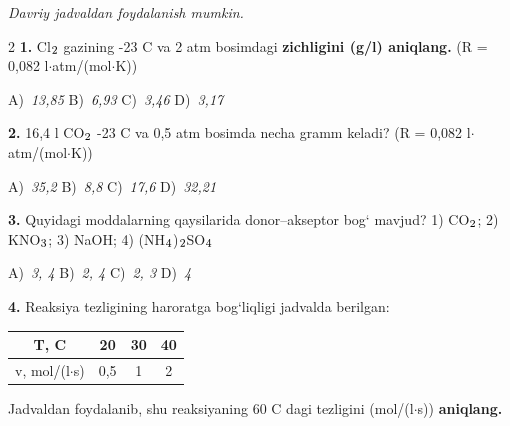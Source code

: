 \documentclass[11pt,a4paper]{article}
\renewcommand{\normalsize}{\fontsize{10.9}{13.4}\selectfont}
\renewcommand{\textsubscript}[1]{\ensuremath{_{\text{\fontsize{8}{8}\selectfont #1}}}}
\begin{document}
\normalsize
\thispagestyle{first}
\noindent{}
\par\medskip
\noindent\textit{Davriy jadvaldan foydalanish mumkin.}
\par\medskip
\begin{multicols}{2}
\noindent\textbf{1.} Cl\textsubscript{2} gazining -23 \textdegree{}C va 2 atm bosimdagi \textbf{zichligini (g/l) aniqlang.} (R = 0,082 l$\cdot$atm/(mol$\cdot$K))

\noindent A)~\textsl{13,85} \hfill B)~\textsl{6,93} \hfill C)~\textsl{3,46} \hfill D)~\textsl{3,17}\par
\vspace{4pt}
\noindent\textbf{2.} 16,4 l CO\textsubscript{2} -23 \textdegree{}C va 0,5 atm bosimda necha gramm keladi? (R = 0,082 l$\cdot$atm/(mol$\cdot$K))

\noindent A)~\textsl{35,2} \hfill B)~\textsl{8,8} \hfill C)~\textsl{17,6} \hfill D)~\textsl{32,21}\par
\vspace{4pt}
\noindent\textbf{3.} Quyidagi moddalarning qaysilarida donor--akseptor bog` mavjud? 1) CO\textsubscript{2}; 2) KNO\textsubscript{3}; 3) NaOH; 4) (NH\textsubscript{4})\textsubscript{2}SO\textsubscript{4}

\noindent A)~\textsl{3, 4} \hfill B)~\textsl{2, 4} \hfill C)~\textsl{2, 3} \hfill D)~\textsl{4}\par
\vspace{4pt}
\noindent\textbf{4.} Reaksiya tezligining haroratga bog`liqligi jadvalda berilgan:
\begin{center}
\renewcommand{\arraystretch}{1.15}
\begin{tabular}{|c|c|c|c|}\hline
\textbf{T, \textdegree{}C} & \textbf{20} & \textbf{30} & \textbf{40} \\ \hline
v, mol/(l$\cdot$s) & 0,5 & 1 & 2 \\ \hline
\end{tabular}
\end{center}
Jadvaldan foydalanib, shu reaksiyaning 60 \textdegree{}C dagi tezligini (mol/(l$\cdot$s)) \textbf{aniqlang.}


\end{multicols}
\end{document}
